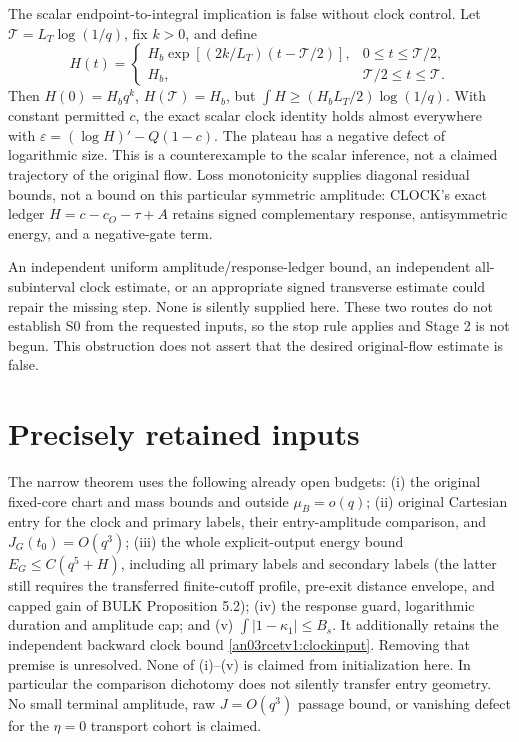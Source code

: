 \documentclass[11pt]{article}
\begin{document}
The scalar endpoint-to-integral implication is false without clock
control. Let $\mathcal T=L_T\log(1/q)$, fix $k>0$, and define
\[
 H(t)=
 \begin{cases}
 H_b\exp[(2k/L_T)(t-\mathcal T/2)],&0\le t\le\mathcal T/2,\\
 H_b,&\mathcal T/2\le t\le\mathcal T.
 \end{cases}
\]
Then $H(0)=H_bq^k$, $H(\mathcal T)=H_b$, but
$\int H\ge(H_bL_T/2)\log(1/q)$.
With constant permitted $c$, the exact scalar clock identity holds
almost everywhere with $\varepsilon=(\log H)'-Q(1-c)$.
The plateau has a negative defect of logarithmic size.
This is a counterexample to the scalar inference, not a claimed
trajectory of the original flow. Loss monotonicity supplies diagonal
residual bounds, not a bound on this particular symmetric amplitude:
CLOCK's exact ledger $H=c-c_O-\tau+A$ retains signed complementary
response, antisymmetric energy, and a negative-gate term.

An independent uniform amplitude/response-ledger bound, an independent
all-subinterval clock estimate, or an appropriate signed transverse
estimate could repair the missing step. None is silently supplied
here. These two routes do not establish S0 from the requested inputs,
so the stop rule applies and Stage 2 is not begun. This obstruction
does not assert that the desired original-flow estimate is false.

\section{Precisely retained inputs}
The narrow theorem uses the following already open budgets:
(i) the original fixed-core chart and mass bounds and outside
$\mu_B=o(q)$; (ii) original Cartesian entry for the clock and
primary labels, their entry-amplitude comparison, and
$J_G(t_0)=O(q^3)$; (iii) the whole explicit-output energy bound
$E_G\le C(q^5+H)$, including all primary labels and secondary labels
(the latter still requires the transferred finite-cutoff profile,
pre-exit distance envelope, and capped gain of BULK Proposition 5.2);
(iv) the response guard, logarithmic duration and amplitude cap;
and (v) $\int|1-\kappa_1|\le B_s$.
It additionally retains the independent backward clock bound
\eqref{an03rcetv1:clockinput}. Removing that premise is unresolved.
None of (i)--(v) is claimed from initialization here. In particular
the comparison dichotomy does not silently transfer entry geometry.
No small terminal amplitude, raw $J=O(q^3)$ passage bound, or
vanishing defect for the $\eta=0$ transport cohort is claimed.
\end{document}
